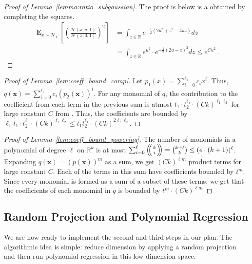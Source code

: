 \documentclass{theoretics}
\renewcommand\vec[1]{\mathbf{#1}}
\DeclareMathOperator*{\E}{\mathbf{E}}
\def\multichoose#1#2{\ensuremath{\left(\kern-.3em\left(\genfrac{}{}{0pt}{}{#1}{#2}\right)\kern-.3em\right)}}
\newcommand{\R}{\mathbb{R}}
\newcommand{\1}{\Ind}
\newcommand{\x}{\vec x}
\newcommand{\Gauss}{\mathcal{N}}
\begin{document}
\begin{proof}[Proof of Lemma~\ref{lemma:ratio_subgaussian}]
\label{proof:ratio_subgaussian}
The proof is below is a obtained by completing the squares.
    \begin{align*}
    \E_{x\sim \Gauss_1}\left[\left(\frac{\Gauss(x;u,1)}{\Gauss(x;0,1)}\right)^2\right]&=\int_{z\in \R} e^{-\frac{1}{2}\left(2u^2+z^2-4uz\right)}dz\\
    &=\int_{z\in \R} e^{{u^2}}\cdot e^{-\frac{1}{2}({2u}-z)^2}dz
    \leq  e^{{Cu^2}} \,.
      \end{align*}
\end{proof}



\begin{proof}[Proof of Lemma~\ref{lem:coeff_bound_comp}]
\label{proof:coeff_bound_comp}
    Let $p_1(x)=\sum_{i=0}^{\ell_1}c_i x^{i}$. Thus, $q(\x)=\sum_{i=0}^{\ell_1}c_i\left(p_2(\x)\right)^i$. For any monomial of $q$, the contribution to the coefficient from each term in the previous sum is atmost $t_1\cdot t_2^{\ell_1}\cdot (Ck)^{\ell_1 \ell_2}$ for large constant $C$ from . Thus, the coefficients are bounded by $\ell_1 t_1\cdot t_2^{\ell_1}\cdot(Ck)^{\ell_1 \ell_2}\leq t_1t_2^{\ell_1}\cdot (Ck)^{2\ell_1 \ell_2}$.
\end{proof}

\begin{proof}[Proof of Lemma~\ref{lem:coeff_bound_powering}]
    The number of monomials in a polynomial of degree $\ell$ on $\R^{k}$ is at most $\sum_{i=0}^{\ell}\multichoose{k}{i}=\binom{k+\ell}{k}\leq (e\cdot(k+1))^{\ell}$. Expanding $q(\x)=(p(\x))^{m}$ as a sum, we get $(Ck)^{\ell m}$ product terms for large constant $C$. Each of the terms in this sum have coefficients bounded by $t^m$. Since every monomial is formed as a sum of a subset of these terms, we get that the coefficients of each monomial in $q$ is bounded by $t^m\cdot (Ck)^{\ell m}$
\end{proof}
\subsection{Random Projection and Polynomial Regression}

We are now ready to implement the second and third steps in our plan. The algorithmic idea is simple: reduce dimension by applying a random projection and then run polynomial regression in this low dimension space.
\end{document}
